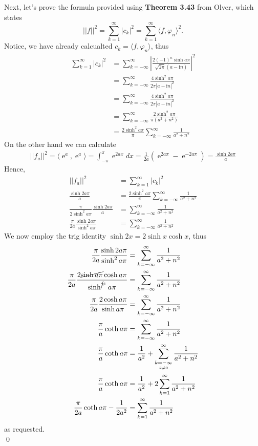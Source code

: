 \documentclass[10pt]{amsart}
\newcommand{\I}{\mathrm{i}}
\DeclareMathOperator{\E}{e}
\theoremstyle{nonumberplain}
\begin{document}
\begin{enumerate}[label={\bf {\arabic*}:}]
\newpage
\noindent
Next, let's prove the formula provided using \textbf{Theorem 3.43} from Olver, which states
$$
||f||^2 = \sum_{k=1}^\infty |c_k|^2 = \sum_{k=1}^{\infty} \langle f, \varphi_n \rangle^2.
$$
Notice, we have already calcualted $c_k = \langle f, \varphi_n \rangle$, thus
\begin{align*}
\sum_{k=1}^{\infty} |c_k|^2
	&= \sum_{k=-\infty}^{\infty} \left| \frac {2 (-1)^n \sinh a \pi} {\sqrt{2 \pi}(a - \I n)} \right| ^2 \\
	&= \sum_{k=-\infty}^{\infty} \frac {4 \sinh^2 a \pi} {2 \pi |a - \I n|^2} \\
	&= \sum_{k=-\infty}^{\infty} \frac {4 \sinh^2 a \pi} {2 \pi |a - \I n|^2} \\
	&= \sum_{k=-\infty}^{\infty} \frac {2 \sinh^2 a \pi} { \pi(a^2 + n^2)} \\
	&= \frac {2 \sinh^2 a \pi} { \pi} \sum_{k=-\infty}^{\infty} \frac 1 {a^2 + n^2}
\end{align*}
On the other hand we can calculate
\begin{align*}
||f_a||^2 = \langle \E^a, \E^a \rangle = \int_{-\pi}^{\pi} \E^{2ax} dx
	= \frac 1 {2a} \left( \E^{2a\pi} - \E^{- 2a\pi} \right) 
	= \frac {\sinh 2a\pi} {a}
\end{align*}
Hence,
\begin{align*}
||f_a||^2 &= \sum_{k=1}^\infty |c_k|^2 \\
\frac {\sinh 2a\pi} {a} &= \frac {2 \sinh^2 a \pi} { \pi} \sum_{k=-\infty}^{\infty} \frac 1 {a^2 + n^2} \\
\frac { \pi} {2 \sinh^2 a \pi} \frac {\sinh 2a\pi} {a} &=\sum_{k=-\infty}^{\infty} \frac 1 {a^2 + n^2} \\
\frac { \pi}{2a} \frac {\sinh 2a\pi} {\sinh^2 a \pi} &=\sum_{k=-\infty}^{\infty} \frac 1 {a^2 + n^2}
\end{align*}
We now employ the trig identity $\sinh 2x = 2\sinh x \cosh x $, thus
\begin{align*}
\frac { \pi}{2a} \frac {\sinh 2a\pi} {\sinh^2 a \pi} &=\sum_{k=-\infty}^{\infty} \frac 1 {a^2 + n^2} \\
\frac { \pi}{2a} \frac {2 \cancel{\sinh a\pi} \cosh a\pi} {\sinh^{\cancel{2}^1} a \pi} &=\sum_{k=-\infty}^{\infty} \frac 1 {a^2 + n^2} \\
\frac { \pi}{2a} \frac {2 \cosh a\pi} {\sinh a \pi} &=\sum_{k=-\infty}^{\infty} \frac 1 {a^2 + n^2} \\
\frac { \pi}{a} \coth a\pi &= \sum_{k=-\infty}^{\infty} \frac 1 {a^2 + n^2} \\
\frac { \pi}{a} \coth a\pi &= \frac 1 {a^2} + \sum_{\underset{k \neq 0}{k = -\infty}}^{\infty} \frac 1 {a^2 + n^2} \\
\frac { \pi}{a} \coth a\pi &= \frac 1 {a^2} + 2\sum_{k = 1}^{\infty} \frac 1 {a^2 + n^2} \\
\frac { \pi}{2a} \coth a\pi - \frac 1 {2a^2} &=  \sum_{k = 1}^{\infty} \frac 1 {a^2 + n^2} \\
\end{align*}
as requested. \\
\qed \\

\end{enumerate}
\end{document}
